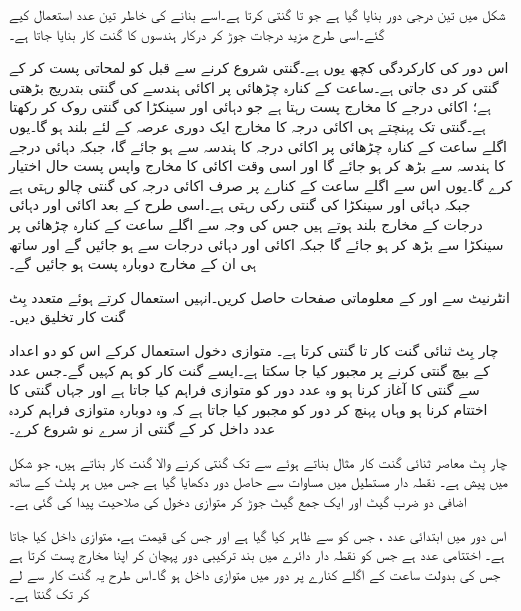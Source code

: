 شکل   میں تین درجی دور بنایا گیا ہے جو  تا  گنتی کرتا ہے۔اسے بنانے کی خاطر تین عدد   استعمال کیے گئے۔اسی طرح مزید درجات جوڑ کر درکار ہندسوں کا  گنت کار بنایا جاتا ہے۔ 


اس دور کی کارکردگی کچھ یوں ہے۔گنتی شروع کرنے سے قبل   کو  لمحاتی  پست کر کے گنتی  کر دی جاتی ہے۔ساعت کے کنارہ چڑھائی پر اکائی  ہندسے کی گنتی بتدریج  بڑھتی ہے؛ اکائی درجے کا مخارج   پست رہتا ہے  جو  دہائی اور سینکڑا کی گنتی  روک کر  رکھتا ہے۔گنتی   تک پہنچتے ہی اکائی درجہ  کا مخارج  ایک دوری عرصہ کے لئے   بلند ہو گا۔یوں اگلے ساعت کے کنارہ چڑھائی  پر اکائی درجہ کا ہندسہ سے   ہو جائے گا، جبکہ دہائی درجے کا ہندسہ  سے بڑھ کر  ہو جائے  گا  اور اسی وقت اکائی کا مخارج    واپس پست  حال اختیار کرے گا۔یوں اس سے اگلے ساعت کے کنارے پر صرف اکائی درجہ کی گنتی چالو رہتی ہے جبکہ دہائی اور سینکڑا کی گنتی  رکی رہتی ہے۔اسی طرح   کے بعد اکائی اور دہائی درجات کے مخارج   بلند ہوتے ہیں جس کی وجہ سے اگلے ساعت کے کنارہ   چڑھائی پر سینکڑا   سے بڑھ کر  ہو جائے گا جبکہ اکائی اور دہائی درجات   سے  ہو جائیں گے اور ساتھ ہی ان کے مخارج    دوبارہ پست ہو جائیں گے۔

انٹرنیٹ سے  اور  کے معلوماتی صفحات حاصل کریں۔انہیں استعمال کرتے ہوئے   متعدد بِٹ گنت کار  تخلیق دیں۔


چار بِٹ ثنائی گنت کار   تا   گنتی کرتا ہے۔ متوازی دخول  استعمال کرکے    اس کو دو اعداد کے  بیچ گنتی کرنے پر مجبور کیا جا سکتا ہے۔ایسے گنت کار کو ہم  کہیں گے۔جس عدد سے   گنتی کا آغاز  کرنا ہو وہ  عدد دور کو  متوازی فراہم کیا جاتا ہے اور جہاں   گنتی کا اختتام کرنا ہو وہاں پہنچ کر  دور کو مجبور کیا جاتا ہے کہ وہ دوبارہ متوازی فراہم کردہ عدد داخل کر کے گنتی از سرے نو شروع کرے۔

چار بِٹ معاصر ثنائی گنت کار  مثال بناتے ہوئے   سے  تک  گنتی کرنے والا گنت کار بناتے ہیں،  جو شکل میں  پیش ہے۔  نقطہ  دار مستطیل میں مساوات   سے حاصل دور دکھایا گیا ہے  جس میں ہر پلٹ کے ساتھ   اضافی دو ضرب گیٹ اور ایک جمع گیٹ جوڑ کر متوازی دخول کی صلاحیت پیدا کی گئی ہے۔

اس دور میں ابتدائی عدد  ، جس کو  سے ظاہر کیا گیا ہے اور جس کی قیمت  ہے، متوازی داخل کیا جاتا ہے۔ اختتامی  عدد  ہے  جس کو  نقطہ دار دائرے میں بند ترکیبی دور پہچان کر اپنا مخارج پست کرتا ہے  جس کی بدولت  ساعت کے اگلے کنارے پر    دور میں  متوازی داخل ہو  گا۔اس طرح یہ  گنت کار  سے لے کر   تک گنتا ہے۔

